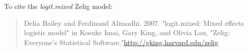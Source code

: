 To cite the \emph{ logit.mixed } Zelig model:
 \begin{verse}
 Delia Bailey and Ferdinand Alimadhi. 2007. "logit.mixed: Mixed effects logistic model" in Kosuke Imai, Gary King, and Olivia Lau, "Zelig: Everyone's Statistical Software,"\url{http://gking.harvard.edu/zelig} 
\end{verse}